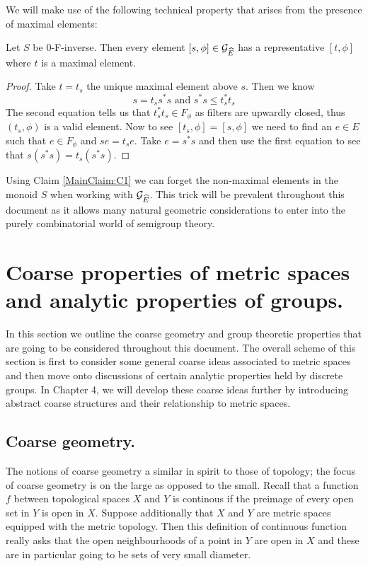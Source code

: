We will make use of the following technical property that arises from the presence of maximal elements:

\begin{claim}\label{MainClaim:C1}
Let $S$ be 0-F-inverse. Then every element $[s,\phi] \in \mathcal{G}_{\widehat{E}}$ has a representative $[t,\phi]$ where $t$ is a maximal element.
\end{claim}
\begin{proof}
Take $t=t_{s}$ the unique maximal element above $s$. Then we know 
\begin{equation*}
s = t_{s}s^{*}s \mbox{ and } s^{*}s \leq t_{s}^{*}t_{s}
\end{equation*} 
The second equation tells us that $t_{s}^{*}t_{s} \in F_{\phi}$ as filters are upwardly closed, thus $(t_{s},\phi)$ is a valid element. Now to see $[t_{s},\phi]=[s,\phi]$ we need to find an $e \in E$ such that $e \in F_{\phi}$ and $se=t_{s}e$. Take $e=s^{*}s$ and then use the first equation to see that $s(s^{*}s)=t_{s}(s^{*}s)$.
\end{proof}
Using Claim \ref{MainClaim:C1} we can forget the non-maximal elements in the monoid $S$ when working with $\mathcal{G}_{\widehat{E}}$. This trick will be prevalent throughout this document as it allows many natural geometric considerations to enter into the purely combinatorial world of semigroup theory.

\section{Coarse properties of metric spaces and analytic properties of groups.}
In this section we outline the coarse geometry and group theoretic properties that are going to be considered throughout this document. The overall scheme of this section is first to consider some general coarse ideas associated to metric spaces and then move onto discussions of certain analytic properties held by discrete groups. In Chapter 4, we will develop these coarse ideas further by introducing abstract coarse structures and their relationship to metric spaces.

\subsection{Coarse geometry.}
The notions of coarse geometry a similar in spirit to those of topology; the focus of coarse geometry is on the large as opposed to the small. Recall that a function $f$ between topological spaces $X$ and $Y$ is continous if the preimage of every open set in $Y$ is open in $X$. Suppose additionally that $X$ and $Y$ are metric spaces equipped with the metric topology. Then this definition of continuous function really asks that the open neighbourhoods of a point in $Y$ are open in $X$ and these are in particular going to be sets of very small diameter. 

